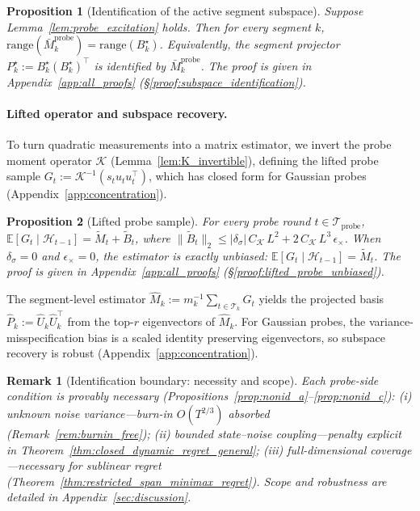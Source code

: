 \documentclass{article}
\newcommand{\E}{\mathbb{E}}
\newcommand{\cH}{\mathcal{H}}
\newcommand{\cT}{\mathcal{T}}
\newcommand{\cTprobe}{\mathcal{T}_{\mathrm{probe}}}
\newcommand{\range}{\mathrm{range}}
\newtheorem{proposition}{Proposition}
\newtheorem{remark}{Remark}
\begin{document}
\begin{proposition}[Identification of the active segment subspace]
\label{prop:subspace_identification}
Suppose Lemma~\ref{lem:probe_excitation} holds.
Then for every segment $k$,
$\range(\bar M_k^{\mathrm{probe}}) = \range(B_k^\star)$.
Equivalently, the segment projector $P_k^\star := B_k^\star (B_k^\star)^\top$ is identified by $\bar M_k^{\mathrm{probe}}$.
The proof is given in Appendix~\ref{app:all_proofs} (\S\ref{proof:subspace_identification}).
\end{proposition}

\paragraph{Lifted operator and subspace recovery.} To turn quadratic measurements into a matrix estimator, we invert the probe moment operator $\mathcal{K}$ (Lemma~\ref{lem:K_invertible}), defining the lifted probe sample $G_t := \mathcal K^{-1}(s_t u_tu_t^\top)$, which has closed form for Gaussian probes (Appendix~\ref{app:concentration}).

\begin{proposition}[Lifted probe sample]
\label{prop:lifted_probe_unbiased}
For every probe round $t\in\cTprobe$,
$\E[G_t \mid \cH_{t-1}] = \widetilde M_t + \widetilde B_t$,
where $\|\widetilde B_t\|_2 \le |\delta_\sigma|\,C_{\mathcal K}\,L^2 + 2\,C_{\mathcal K}\,L^3\,\epsilon_\times$.
When $\delta_\sigma = 0$ and $\epsilon_\times = 0$, the estimator is exactly unbiased: $\E[G_t \mid \cH_{t-1}] = \widetilde M_t$.
The proof is given in Appendix~\ref{app:all_proofs} (\S\ref{proof:lifted_probe_unbiased}).
\end{proposition}

The segment-level estimator $\widehat M_k := m_k^{-1}\sum_{t\in\cT_k} G_t$ yields the projected basis $\widehat P_k := \widehat U_k \widehat U_k^\top$ from the top-$r$ eigenvectors of $\widehat M_k$. For Gaussian probes, the variance-misspecification bias is a scaled identity preserving eigenvectors, so subspace recovery is robust (Appendix~\ref{app:concentration}).

\begin{remark}[Identification boundary: necessity and scope]
  \label{rem:necessity_compact}
  Each probe-side condition is provably necessary (Propositions~\ref{prop:nonid_a}--\ref{prop:nonid_c}):
  \emph{(i)} unknown noise variance---burn-in $O(T^{2/3})$ absorbed (Remark~\ref{rem:burnin_free});
  \emph{(ii)} bounded state--noise coupling---penalty explicit in Theorem~\ref{thm:closed_dynamic_regret_general};
  \emph{(iii)} full-dimensional coverage---necessary for sublinear regret (Theorem~\ref{thm:restricted_span_minimax_regret}).
  Scope and robustness are detailed in Appendix~\ref{sec:discussion}.
  \end{remark}
\end{document}
